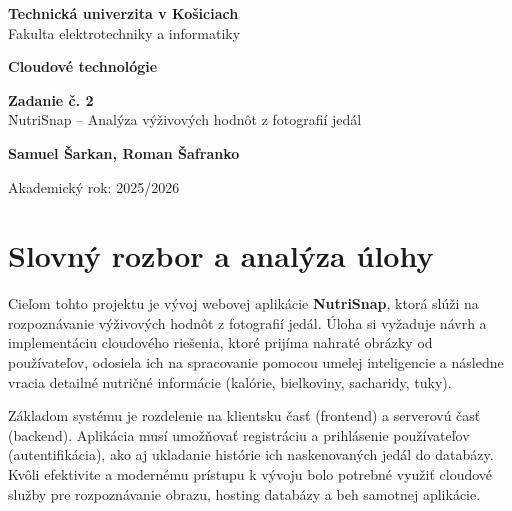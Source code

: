 \documentclass[12pt, a4paper]{article}
\begin{document}
\begin{titlepage}
    \centering
    \vspace*{2cm}
    
    {\Large \textbf{Technická univerzita v Košiciach}}\\
    {\Large Fakulta elektrotechniky a informatiky}
    
    \vspace{4cm}
    
    {\Huge \textbf{Cloudové technológie}}\\
    
    \vspace{1.5cm}
    
    {\huge \textbf{Zadanie č. 2}}\\
    \vspace{0.5cm}
    {\Large NutriSnap – Analýza výživových hodnôt z fotografií jedál}
    
    \vspace{4cm}
    
    {\Large \textbf{Samuel Šarkan, Roman Šafranko}}\\
    
    \vspace{4cm}
    
    {\Large Akademický rok: 2025/2026}
    
\end{titlepage}

\tableofcontents
\newpage

\section{Slovný rozbor a analýza úlohy}
Cieľom tohto projektu je vývoj webovej aplikácie \textbf{NutriSnap}, ktorá slúži na rozpoznávanie výživových hodnôt z fotografií jedál. Úloha si vyžaduje návrh a implementáciu cloudového riešenia, ktoré prijíma nahraté obrázky od používateľov, odosiela ich na spracovanie pomocou umelej inteligencie a následne vracia detailné nutričné informácie (kalórie, bielkoviny, sacharidy, tuky). 

Základom systému je rozdelenie na klientsku časť (frontend) a serverovú časť (backend). Aplikácia musí umožňovať registráciu a prihlásenie používateľov (autentifikácia), ako aj ukladanie histórie ich naskenovaných jedál do databázy. Kvôli efektivite a modernému prístupu k vývoju bolo potrebné využiť cloudové služby pre rozpoznávanie obrazu, hosting databázy a beh samotnej aplikácie.
\end{document}
